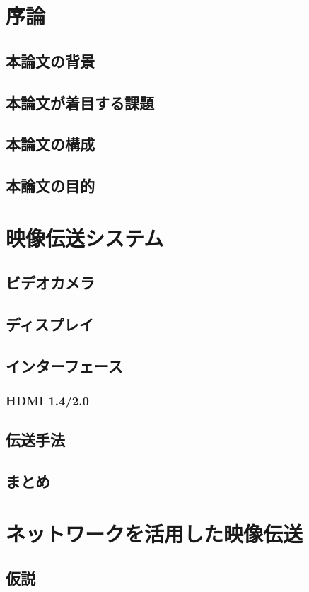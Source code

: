 \chapter{序論}
\section{本論文の背景}
\section{本論文が着目する課題}
\section{本論文の構成}
\section{本論文の目的}

\chapter{映像伝送システム}
\section{ビデオカメラ}
\section{ディスプレイ}
\section{インターフェース}
\subsection{HDMI 1.4/2.0}
\section{伝送手法}
\section{まとめ}

\chapter{ネットワークを活用した映像伝送}
\section{仮説}
